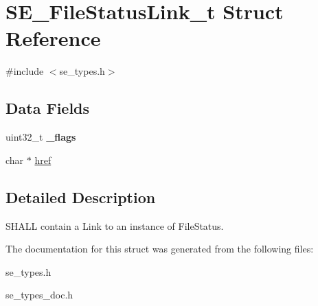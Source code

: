 \hypertarget{structSE__FileStatusLink__t}{}\section{S\+E\+\_\+\+File\+Status\+Link\+\_\+t Struct Reference}
\label{structSE__FileStatusLink__t}


{\ttfamily \#include $<$se\+\_\+types.\+h$>$}

\subsection*{Data Fields}
\begin{DoxyCompactItemize}
\item 
uint32\+\_\+t {\bfseries \+\_\+flags}
\item 
char $\ast$ \hyperlink{group__FileStatusLink_ga5cbd31e8cea3d76aa24c5e3197680143}{href}
\end{DoxyCompactItemize}


\subsection{Detailed Description}
S\+H\+A\+LL contain a Link to an instance of File\+Status. 

The documentation for this struct was generated from the following files\+:\begin{DoxyCompactItemize}
\item 
se\+\_\+types.\+h\item 
se\+\_\+types\+\_\+doc.\+h\end{DoxyCompactItemize}
